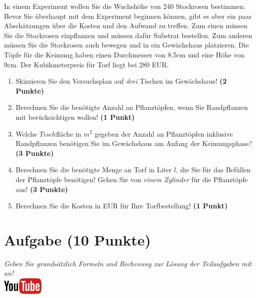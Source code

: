 \documentclass[a4paper, 9pt]{scrartcl}\usepackage[]{graphicx}\usepackage[]{xcolor}
\begin{document}
In einem Experiment wollen Sie die Wuchsh{\"o}he von 240
Stockrosen bestimmen. Bevor Sie {\"u}berhaupt mit dem Experiment beginnen
k{\"o}nnen, gibt es aber ein paar Absch{\"a}tzungen {\"u}ber die Kosten und den Aufwand
zu treffen. Zum einen m{\"u}ssen Sie die Stockrosen einpflanzen und m{\"u}ssen
daf{\"u}r Substrat bestellen. Zum anderen m{\"u}ssen Sie die Stockrosen auch
bewegen und in ein Gew{\"a}chshaus platzieren. Die T{\"o}pfe f{\"u}r die Keimung haben
einen Durchmesser von 8.5cm und eine H{\"o}he von 9cm. Der
Kubikmeterpreis f{\"u}r Torf liegt bei 280 EUR.

\begin{enumerate}
\item Skizzieren Sie den Versuchsplan auf \textit{drei} Tischen im
  Gew{\"a}chshaus! \textbf{(2 Punkte)}
\item Berechnen Sie die ben{\"o}tigte Anzahl an Pflanzt{\"o}pfen, wenn Sie
  Randpflanzen mit ber{\"u}cksichtigen wollen! \textbf{(1 Punkt)}
\item Welche $Tisch$fl{\"a}che in $m^2$ gegeben der Anzahl an
  Pflanzt{\"o}pfen inklusive Randpflanzen ben{\"o}tigen Sie im Gew{\"a}chshaus am
  Anfang der Keimungsphase?  \textbf{(3 Punkte)}
\item Berechnen Sie die ben{\"o}tigte Menge an Torf in Liter $l$, die Sie f{\"u}r
  das Bef{\"u}llen der Pflanzt{\"o}pfe ben{\"o}tigen! Gehen Sie von \textit{einem
    Zylinder} f{\"u}r die Pflanzt{\"o}pfe aus!  \textbf{(3 Punkte)}
\item Berechnen Sie die Kosten in EUR f{\"u}r Ihre Torfbestellung! \textbf{(1
    Punkt)}
\end{enumerate}



 
\clearpage

\section{Aufgabe \hfill (10 Punkte)}

\textit{Geben Sie grunds{\"a}tzlich Formeln und Rechenweg zur L{\"o}sung der
  Teilaufgaben mit an!} \\[1Ex]

\hfill\href{https://youtu.be/n451XnhtSh4}{\includegraphics[width = 2cm]{img/youtube}} %
\hspace{2Ex}
\end{document}
